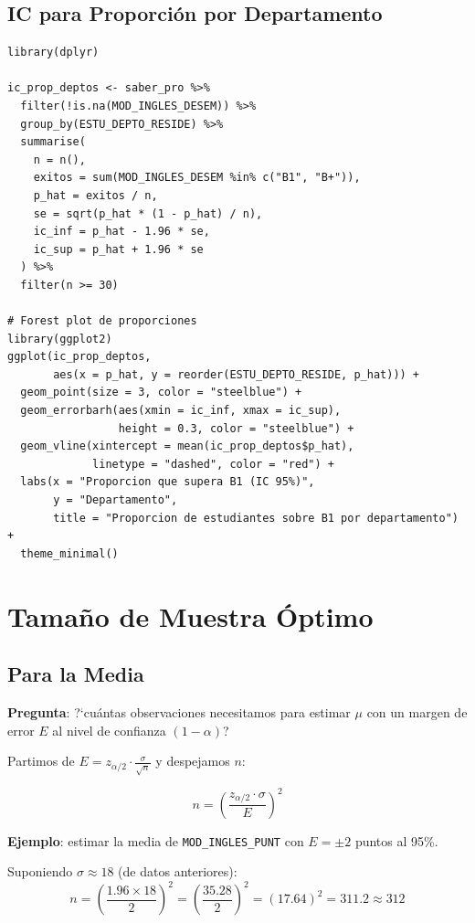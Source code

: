 \documentclass[11pt, a4paper]{article}
\begin{document}
\subsection{IC para Proporci\'on por Departamento}

\begin{lstlisting}
library(dplyr)

ic_prop_deptos <- saber_pro %>%
  filter(!is.na(MOD_INGLES_DESEM)) %>%
  group_by(ESTU_DEPTO_RESIDE) %>%
  summarise(
    n = n(),
    exitos = sum(MOD_INGLES_DESEM %in% c("B1", "B+")),
    p_hat = exitos / n,
    se = sqrt(p_hat * (1 - p_hat) / n),
    ic_inf = p_hat - 1.96 * se,
    ic_sup = p_hat + 1.96 * se
  ) %>%
  filter(n >= 30)

# Forest plot de proporciones
library(ggplot2)
ggplot(ic_prop_deptos,
       aes(x = p_hat, y = reorder(ESTU_DEPTO_RESIDE, p_hat))) +
  geom_point(size = 3, color = "steelblue") +
  geom_errorbarh(aes(xmin = ic_inf, xmax = ic_sup),
                 height = 0.3, color = "steelblue") +
  geom_vline(xintercept = mean(ic_prop_deptos$p_hat),
             linetype = "dashed", color = "red") +
  labs(x = "Proporcion que supera B1 (IC 95%)",
       y = "Departamento",
       title = "Proporcion de estudiantes sobre B1 por departamento") +
  theme_minimal()
\end{lstlisting}

\section{Tama\~no de Muestra \'Optimo}

\subsection{Para la Media}

\textbf{Pregunta}: ?`cu\'antas observaciones necesitamos para estimar $\mu$ con un margen de error $E$ al nivel de confianza $(1-\alpha)$?

Partimos de $E = z_{\alpha/2} \cdot \frac{\sigma}{\sqrt{n}}$ y despejamos $n$:

\[
\boxed{n = \left(\frac{z_{\alpha/2} \cdot \sigma}{E}\right)^2}
\]

\textbf{Ejemplo}: estimar la media de \texttt{MOD\_INGLES\_PUNT} con $E = \pm 2$ puntos al 95\%.

Suponiendo $\sigma \approx 18$ (de datos anteriores):
\[
n = \left(\frac{1.96 \times 18}{2}\right)^2 = \left(\frac{35.28}{2}\right)^2 = (17.64)^2 = 311.2 \approx 312
\]
\end{document}
